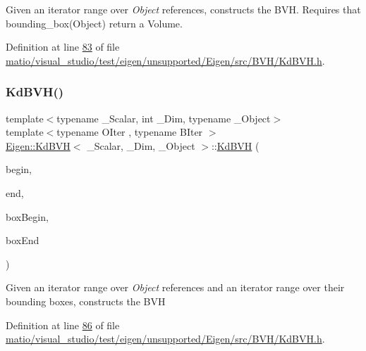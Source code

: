 Given an iterator range over {\itshape Object} references, constructs the B\+VH. Requires that bounding\+\_\+box(\+Object) return a Volume. 

Definition at line \hyperlink{matio_2visual__studio_2test_2eigen_2unsupported_2_eigen_2src_2_b_v_h_2_kd_b_v_h_8h_source_l00083}{83} of file \hyperlink{matio_2visual__studio_2test_2eigen_2unsupported_2_eigen_2src_2_b_v_h_2_kd_b_v_h_8h_source}{matio/visual\+\_\+studio/test/eigen/unsupported/\+Eigen/src/\+B\+V\+H/\+Kd\+B\+V\+H.\+h}.

\mbox{\label{class_eigen_1_1_kd_b_v_h_a94f781127eeec80a7659b8a625e2fa94}} 
\subsubsection{\texorpdfstring{Kd\+B\+V\+H()}{KdBVH()}\hspace{0.1cm}{\footnotesize\ttfamily [4/4]}}
{\footnotesize\ttfamily template$<$typename \+\_\+\+Scalar, int \+\_\+\+Dim, typename \+\_\+\+Object$>$ \\
template$<$typename O\+Iter , typename B\+Iter $>$ \\
\hyperlink{class_eigen_1_1_kd_b_v_h}{Eigen\+::\+Kd\+B\+VH}$<$ \+\_\+\+Scalar, \+\_\+\+Dim, \+\_\+\+Object $>$\+::\hyperlink{class_eigen_1_1_kd_b_v_h}{Kd\+B\+VH} (\begin{DoxyParamCaption}\item[{O\+Iter}]{begin,  }\item[{O\+Iter}]{end,  }\item[{B\+Iter}]{box\+Begin,  }\item[{B\+Iter}]{box\+End }\end{DoxyParamCaption})\hspace{0.3cm}{\ttfamily [inline]}}

Given an iterator range over {\itshape Object} references and an iterator range over their bounding boxes, constructs the B\+VH 

Definition at line \hyperlink{matio_2visual__studio_2test_2eigen_2unsupported_2_eigen_2src_2_b_v_h_2_kd_b_v_h_8h_source_l00086}{86} of file \hyperlink{matio_2visual__studio_2test_2eigen_2unsupported_2_eigen_2src_2_b_v_h_2_kd_b_v_h_8h_source}{matio/visual\+\_\+studio/test/eigen/unsupported/\+Eigen/src/\+B\+V\+H/\+Kd\+B\+V\+H.\+h}.




